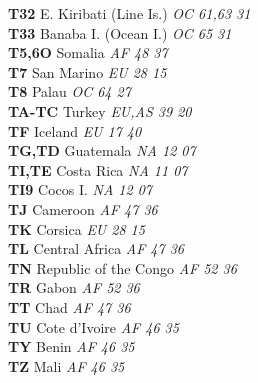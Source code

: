 ﻿\documentclass[landscape,a4paper]{article}
\begin{document}
\begin{multicols}{6}
\textbf{T32                     } E. Kiribati (Line Is.)             \emph{ OC     61,63  31    } \\
\textbf{T33                     } Banaba I. (Ocean I.)               \emph{ OC     65     31    } \\
\textbf{T5,6O                   } Somalia                            \emph{ AF     48     37    } \\
\textbf{T7                      } San Marino                         \emph{ EU     28     15    } \\
\textbf{T8                      } Palau                              \emph{ OC     64     27    } \\
\textbf{TA-TC                   } Turkey                             \emph{ EU,AS  39     20    } \\
\textbf{TF                      } Iceland                            \emph{ EU     17     40    } \\
\textbf{TG,TD                   } Guatemala                          \emph{ NA     12     07    } \\
\textbf{TI,TE                   } Costa Rica                         \emph{ NA     11     07    } \\
\textbf{TI9                     } Cocos I.                           \emph{ NA     12     07    } \\
\textbf{TJ                      } Cameroon                           \emph{ AF     47     36    } \\
\textbf{TK                      } Corsica                            \emph{ EU     28     15    } \\
\textbf{TL                      } Central Africa                     \emph{ AF     47     36    } \\
\textbf{TN                      } Republic of the Congo              \emph{ AF     52     36    } \\
\textbf{TR                      } Gabon                              \emph{ AF     52     36    } \\
\textbf{TT                      } Chad                               \emph{ AF     47     36    } \\
\textbf{TU                      } Cote d'Ivoire                      \emph{ AF     46     35    } \\
\textbf{TY                      } Benin                              \emph{ AF     46     35    } \\
\textbf{TZ                      } Mali                               \emph{ AF     46     35    } \\

\end{multicols}
\end{document}
